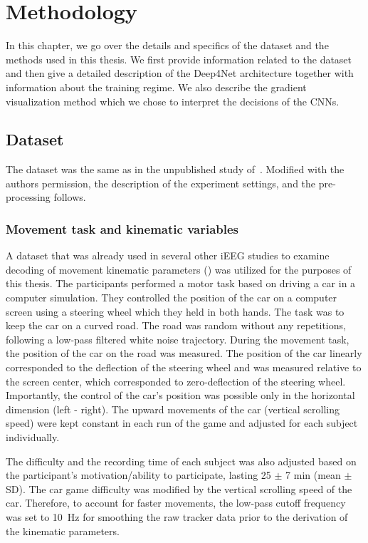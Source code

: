 \chapter{Methodology}\label{ch:methodology}
In this chapter, we go over the details and specifics of the dataset and the methods used in this thesis.
We first provide information related to the dataset and then give a detailed description of the Deep4Net architecture together with information about the training regime.
We also describe the gradient visualization method which we chose to interpret the decisions of the CNNs.

\section{Dataset}\label{sec:dataset}
The dataset was the same as in the unpublished study of~\cite{Hammer-2021}.
Modified with the authors permission, the description of the experiment settings, and the pre-processing follows.

\subsection{Movement task and kinematic variables}\label{subsec:movement-task-and-kinematic-variables}
A dataset that was already used in several other iEEG studies to examine decoding of movement kinematic parameters (\cite{Hammer-2021,hammer-predominance-2016,hammer-role-2013}) was utilized for the purposes of this thesis.
The participants performed a motor task based on driving a car in a computer simulation.
They controlled the position of the car on a computer screen using a steering wheel which they held in both hands.
The task was to keep the car on a curved road.
The road was random without any repetitions, following a low-pass filtered white noise trajectory.
During the movement task, the position of the car on the road was measured.
The position of the car linearly corresponded to the deflection of the steering wheel and was measured relative to the screen center, which corresponded to zero-deflection of the steering wheel.
Importantly, the control of the car's position was possible only in the horizontal dimension (left - right).
The upward movements of the car (vertical scrolling speed) were kept constant in each run of the game and adjusted for each subject individually.

The difficulty and the recording time of each subject was also adjusted based on the participant's motivation/ability to participate, lasting 25 $\pm$ 7 min (mean $\pm$ SD).
The car game difficulty was modified by the vertical scrolling speed of the car.
Therefore, to account for faster movements, the low-pass cutoff frequency was set to 10~Hz for smoothing the raw tracker data prior to the derivation of the kinematic parameters.

